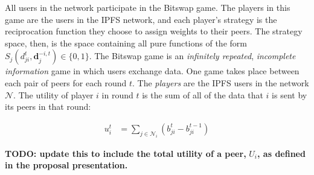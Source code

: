 \documentclass[12pt,letterpaper,]{article}
\newcommand{\Network}{\ensuremath{\mathcal{N}}}
\newcommand{\Nbhd}[1]{\ensuremath{\mathcal{N}_{#1}}}
\begin{document}
All users in the network participate in the Bitswap game. The players in
this game are the users in the IPFS network, and each player's strategy
is the reciprocation function they choose to assign weights to their
peers. The strategy space, then, is the space containing all pure
functions of the form
\(S_j(d_{ji}^t, \mathbf{d}_j^{-i,t}) \in \{0, 1\}\). The Bitswap game is
an \emph{infinitely repeated}, \emph{incomplete information} game in
which users exchange data. One game takes place between each pair of
peers for each round \(t\). The \emph{players} are the IPFS users in the
network \Network. The utility of player \(i\) in round \(t\) is the sum
of all of the data that \(i\) is sent by its peers in that round:

\begin{align*}
u_i^t &= \sum_{j \in \Nbhd{i}} (b_{ji}^t - b_{ji}^{t-1})
\end{align*}

\textbf{TODO: update this to include the total utility of a peer,}
\(U_i\)\textbf{, as defined in the proposal presentation.}

                

    
\end{document}
